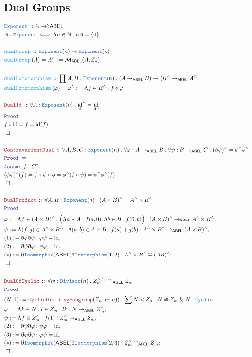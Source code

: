 \documentclass[12pt]{scrartcl}
\newcommand{\TYPE}[1]{\textcolor{NavyBlue}{\mathtt{#1}}}
\newcommand{\FUNC}[1]{\textcolor{Cerulean}{\mathtt{#1}}}
\newcommand{\LOGIC}[1]{\textcolor{Blue}{\mathtt{#1}}}
\newcommand{\THM}[1]{\textcolor{Maroon}{\mathtt{#1}}}
\renewcommand{\.}{\; . \;}
\newcommand{\de}{: \kern 0.1pc =}
\newcommand{\Act}[1]{\left( #1 \right)}
\newcommand{\Theorem}[2]{& \THM{#1} \, :: \, #2 \\ & \Proof = \\ }
\newcommand{\DeclareType}[2]{& \TYPE{#1} \, :: \, #2 \\}
\newcommand{\DefineType}[3]{& #1 : \TYPE{#2} \iff #3 \\}
\newcommand{\DeclareFunc}[2]{& \FUNC{#1} \, :: \, #2 \\}
\newcommand{\DefineNamedFunc}[4]{&  \FUNC{#1}\Act{#2} = #3 \de #4 \\}
\newcommand{\Page}[1]{ \begin{align*} #1 \end{align*}   }
\newcommand{ \bd }{ \ByDef }
\renewcommand{\And}{\; \& \;}
\newcommand{\Nat}{\mathbb{N} }
\DeclareMathOperator*{\id}{id}
\newcommand{\Say}[3]{& #1 \de #2 : #3, \\}
\newcommand{\Conclude}[3]{& #1 \de #2 : #3; \\}
\newcommand{\Assume}[2]{& \LOGIC{Assume} \; #1 : #2, \\}
\newcommand{\QED}{\; \square}
\newcommand{\EndProof}{& \QED \\}
\newcommand{\ByDef}{\eth}
\newcommand{\Proof}{\LOGIC{Proof} \; }
\newcommand{\Nrml}{\vartriangleleft}
\newcommand{\ABEL}{\mathsf{ABEL}}
\begin{document}
\subsection{Dual Groups}
\Page{
	\DeclareType{Exponent}{\Nat \to ?\ABEL}
	\DefineType{A}{Exponent}{\Lambda n \in \Nat \. nA = \{0\}}
	\\
	\DeclareFunc{dualGroup}{\TYPE{Exponent}(n) \to \TYPE{Exponent}(n)}
	\DefineNamedFunc{dualGroup}{ A  }{A^\wedge}{ \mathcal{M}_{\ABEL}(A,Z_n)  }
	\\
	\DeclareFunc{dualHomomorphism}{ \prod A,B : \TYPE{Exponent}(n) \. (A \to_{\ABEL} B) \to (B^\wedge \to_{\ABEL} A^\wedge)  }
	\DefineNamedFunc{dualHomomorphism}{\varphi}{\varphi^\wedge}{ \Lambda  f \in B^\wedge \.  f \circ \varphi }
	\\
	\Theorem{DualId}{\forall A  : \TYPE{Exponent}(n) \. {\id_A}^\wedge = \id_{A^\wedge} }
	& f \circ \id = f  = \id(f)\\
	\EndProof
	\\
	\Theorem{ContravariantDual}{\forall A,B,C : \TYPE{Exponent}(n) \. \forall \varphi : A \to_{\ABEL} B \. 
	\forall \psi : B \to_{\ABEL} C \. (\phi\psi)^\wedge = \psi^\wedge\phi^\wedge 
	}
	\Assume{f}{C^\wedge}
	& (\phi\psi)^\wedge(f) = f \circ \psi \circ \phi = \phi^\wedge(f \circ \psi) = \psi^\wedge \phi^\wedge(f)   \\
	\EndProof
	\\
	\Theorem{DualProduct}{\forall A,B : \TYPE{Exponent}(n) \. (A\times B)^{\wedge} = A^\wedge \times B^\wedge}
	\Say{\varphi}{\Lambda f \in (A \times B)^\wedge \. \Big(\Lambda a \in A \. f(a,0) , \Lambda b \in B \. f(0,b)\Big) }
	{(A \times B)^\wedge \to_{\ABEL} A^\wedge \times B^\wedge}
	\Say{\psi}{\Lambda (f,g) \in A^\wedge \times B^\wedge \. \Lambda (a,b) \in A \times B \. f(a) + g(b)}
	{A^\wedge \times B^\wedge  \to_{\ABEL} (A \times B)^\wedge}
	\Say{(1)}{\bd \varphi \bd \psi}{ \varphi \psi = \id}
	\Say{(2)}{\bd \psi \bd \varphi}{ \psi \varphi = \id}
	\Conclude{(*)}{\bd \TYPE{Isomorphic}(\ABEL)\bd \TYPE{Isomorphism}(1,2)}{A^\wedge \times B^\wedge \cong (AB)^\wedge}
	\EndProof
	\\
	\Theorem{DualOfCyclic}{\forall m : \TYPE{Divisor}(n) \. Z_m^{\wedge(n)} \cong_{\ABEL} Z_m }
	\Say{(N,1)}{\THM{CyclicDividingSubgroup}(Z_n,m,n))}{ \sum N \Nrml Z_n \. N \cong Z_m \And N : \TYPE{Cyclic}}
	\Say{\varphi}{ \Lambda k \in N \. l \in Z_m \. lk }{ N \to_{\ABEL} Z_m^{\wedge}}
	\Say{\psi}{ \Lambda f \in Z_m^\wedge  \. f(1) }{Z_m^{\wedge} \to_{\ABEL} Z_m}
	\Say{(2)}{\bd \psi \bd \varphi}{\psi \varphi = \id}
	\Say{(3)}{\bd \varphi \bd \psi}{\varphi \psi = \id}
	\Conclude{(*)}{\bd \TYPE{Isomorphic}(\ABEL)\bd \TYPE{Isomorphism}(2,3)}{ Z_m^{\wedge} \cong_{\ABEL} Z_m   }
	\EndProof
}
\end{document}

